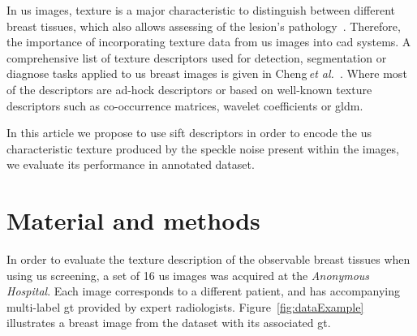 \documentclass[a4paper, 10pt, conference]{llncs}      %
\begin{document}

In \ac{us} images, texture is a major characteristic to distinguish between different breast tissues, which also allows assessing of the lesion's pathology~\cite{stavros2004breast}.  Therefore, the importance of incorporating texture data from  \ac{us} images into \ac{cad} systems. A comprehensive list of texture descriptors used for detection, segmentation or diagnose tasks applied to \ac{us} breast images is given in Cheng\,\emph{et al.}~\cite{Cheng:2009p10580}. Where most of the descriptors are ad-hock descriptors or based on well-known texture descriptors such as co-occurrence matrices, wavelet coefficients or \ac{gldm}.



In this article we propose to use \ac{sift} descriptors in order to encode the \ac{us} characteristic texture produced by the speckle noise present within the images, we evaluate its performance in annotated dataset.  

\section{Material and methods}
In order to evaluate the texture description of the observable breast tissues when using \ac{us} screening, a set of 16 \ac{us} images was acquired at the \emph{Anonymous Hospital}. Each image corresponds to a different patient, and has accompanying multi-label \ac{gt} provided by expert radiologists. Figure~\ref{fig:dataExample} illustrates a breast image from the dataset with its associated \ac{gt}. 
\end{document}
